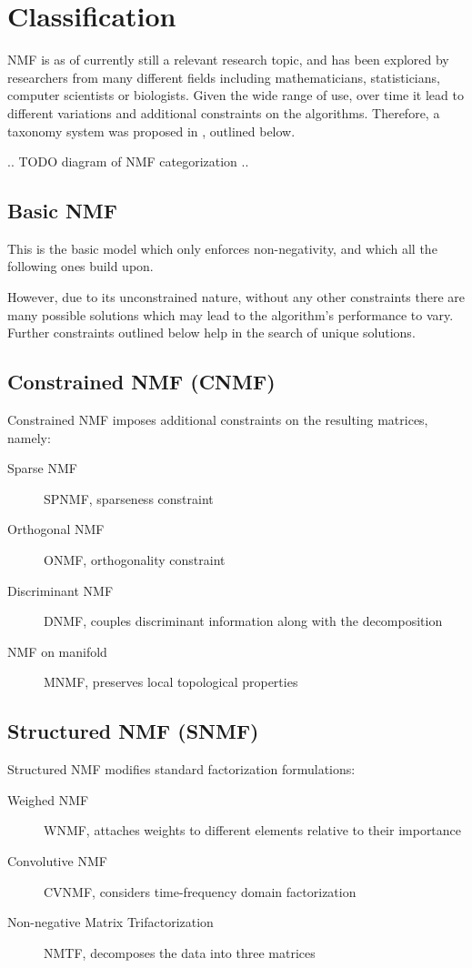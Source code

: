 \section{Classification}
NMF is as of currently still a relevant research topic, and has been explored by researchers from many different fields including mathematicians, statisticians, computer scientists or biologists. Given the wide range of use, over time it lead to different variations and additional constraints on the algorithms. Therefore, a taxonomy system was proposed in \cite{wang_zhang_2013}, outlined below.

.. TODO diagram of NMF categorization ..

\subsection{Basic NMF}
This is the basic model which only enforces non-negativity, and which all the following ones build upon.

However, due to its unconstrained nature, without any other constraints there are many possible solutions  which may lead to the algorithm's performance to vary. Further constraints outlined below help in the search of unique solutions.

\subsection{Constrained NMF (CNMF)}
Constrained NMF imposes additional constraints on the resulting matrices, namely:

\begin{description}
	\item[Sparse NMF] SPNMF, sparseness constraint
	\item[Orthogonal NMF] ONMF, orthogonality constraint
	\item[Discriminant NMF] DNMF, couples discriminant information along with the decomposition
	\item[NMF on manifold] MNMF, preserves local topological properties
\end{description}

\subsection{Structured NMF (SNMF)}
Structured NMF modifies standard factorization formulations:

\begin{description}
	\item[Weighed NMF] WNMF, attaches weights to different elements relative to their importance
	\item[Convolutive NMF] CVNMF, considers time-frequency domain factorization
	\item[Non-negative Matrix Trifactorization] NMTF, decomposes the data into three matrices
\end{description}

